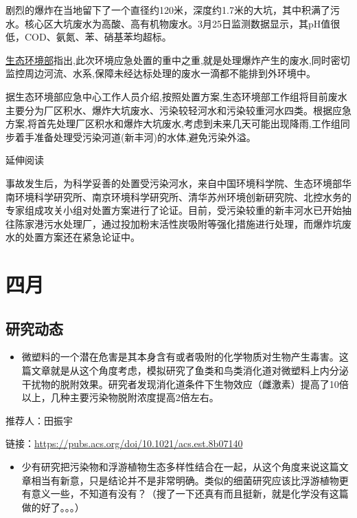 \documentclass[]{book}
\providecommand{\tightlist}{%
  \setlength{\itemsep}{0pt}\setlength{\parskip}{0pt}}
\begin{document}
剧烈的爆炸在当地留下了一个直径约120米，深度约1.7米的大坑，其中积满了污水。核心区大坑废水为高酸、高有机物废水。3月25日监测数据显示，其pH值很低，COD、氨氮、苯、硝基苯均超标。

\href{http://legal.people.com.cn/n1/2019/0330/c42510-31004429.html}{生态环境部}指出,此次环境应急处置的重中之重,就是处理爆炸产生的废水,同时密切监控周边河流、水系,保障未经达标处理的废水一滴都不能排到外环境中。

据生态环境部应急中心工作人员介绍,按照处置方案,生态环境部工作组将目前废水主要分为厂区积水、爆炸大坑废水、污染较轻河水和污染较重河水四类。根据应急方案,将首先处理厂区积水和爆炸大坑废水,考虑到未来几天可能出现降雨,工作组同步着手准备处理受污染河道(新丰河)的水体,避免污染外溢。

延伸阅读

事故发生后，为科学妥善的处置受污染河水，来自中国环境科学院、生态环境部华南环境科学研究所、南京环境科学研究所、清华苏州环境创新研究院、北控水务的专家组成攻关小组对处置方案进行了论证。目前，受污染较重的新丰河水已开始抽往陈家港污水处理厂，通过投加粉末活性炭吸附等强化措施进行处理，而爆炸坑废水的处置方案还在紧急论证中。

\hypertarget{ux56dbux6708-1}{%
\section*{四月}\label{ux56dbux6708-1}}

\hypertarget{ux7814ux7a76ux52a8ux6001-17}{%
\subsection*{研究动态}\label{ux7814ux7a76ux52a8ux6001-17}}

\begin{itemize}
\tightlist
\item
  微塑料的一个潜在危害是其本身含有或者吸附的化学物质对生物产生毒害。这篇文章就是从这个角度考虑，模拟研究了鱼类和鸟类消化道对微塑料上内分泌干扰物的脱附效果。研究者发现消化道条件下生物效应（雌激素）提高了10倍以上，几种主要污染物脱附浓度提高2倍左右。
\end{itemize}

推荐人：田振宇

链接：\url{https://pubs.acs.org/doi/10.1021/acs.est.8b07140}

\begin{itemize}
\tightlist
\item
  少有研究把污染物和浮游植物生态多样性结合在一起，从这个角度来说这篇文章相当有新意，只是结论并不是非常明确。类似的细菌研究应该比浮游植物更有意义一些，不知道有没有？（搜了一下还真有而且挺新，就是化学没有这篇做的好了。。。）
\end{itemize}
\end{document}
